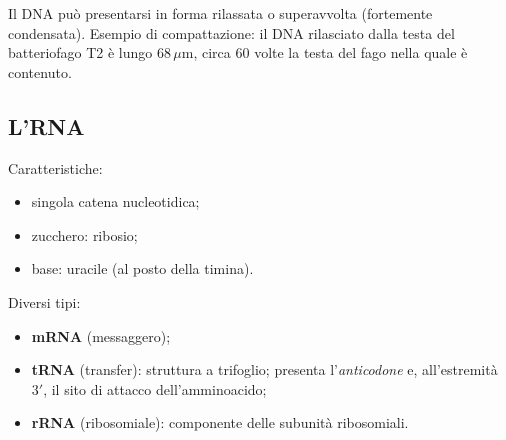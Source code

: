 Il DNA può presentarsi in forma rilassata o superavvolta (fortemente condensata). Esempio di compattazione: il DNA rilasciato dalla testa del batteriofago T2 è lungo 68\,$\mu$m, circa 60 volte la testa del fago nella quale è contenuto.

\subsection{L'RNA}

Caratteristiche:
\begin{itemize}
  \item singola catena nucleotidica;
  \item zucchero: ribosio;
  \item base: uracile (al posto della timina).
\end{itemize}

Diversi tipi:
\begin{itemize}
  \item \textbf{mRNA} (messaggero);
  \item \textbf{tRNA} (transfer): struttura a trifoglio; presenta l'\textit{anticodone} e, all'estremità $3'$, il sito di attacco dell'amminoacido;
  \item \textbf{rRNA} (ribosomiale): componente delle subunità ribosomiali.
\end{itemize}
